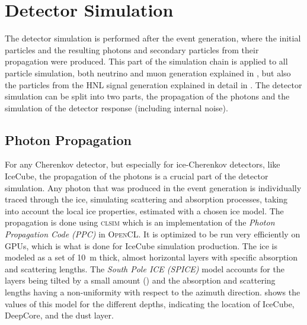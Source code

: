 \section{Detector Simulation}

The detector simulation is performed after the event generation, where the initial particles and the resulting photons and secondary particles from their propagation were produced. This part of the simulation chain is applied to all particle simulation, both neutrino and muon generation explained in , but also the particles from the HNL signal generation explained in detail in . The detector simulation can be split into two parts, the propagation of the photons and the simulation of the detector response (including internal noise).


\subsection{Photon Propagation}

For any Cherenkov detector, but especially for ice-Cherenkov detectors, like IceCube, the propagation of the photons is a crucial part of the detector simulation. Any photon that was produced in the event generation is individually traced through the ice, simulating scattering and absorption processes, taking into account the local ice properties, estimated with a chosen ice model. The propagation is done using \textsc{clsim} \cite{clsim} which is an implementation of the \textit{Photon Propagation Code (\textsc{PPC})}  in \textsc{OpenCL}. It is optimized to be run very efficiently on GPUs, which is what is done for IceCube simulation production. The ice is modeled as a set of \SI{10}{\meter} thick, almost horizontal layers with specific absorption and scattering lengths. The \textit{South Pole ICE (SPICE)} model  accounts for the layers being tilted by a small amount () and the absorption and scattering lengths having a non-uniformity with respect to the azimuth direction.   shows the values of this model for the different depths, indicating the location of IceCube, DeepCore, and the dust layer. 



